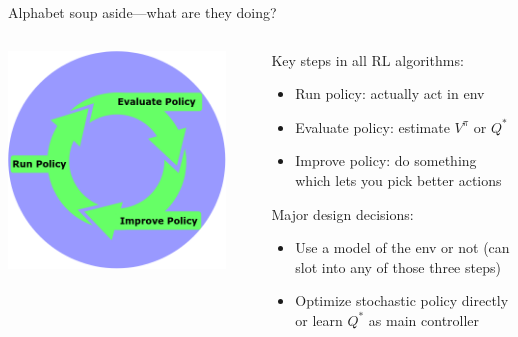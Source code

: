 \documentclass[9pt]{beamer}
\begin{document}
\begin{frame}{Alphabet soup aside---what are they doing?}


\begin{columns}
\begin{column}{0.33\textwidth}
\includegraphics[width=0.9\textwidth]{rl_loop}
\end{column}
\begin{column}{0.67\textwidth}
Key steps in all RL algorithms:
\begin{itemize}
\item Run policy: actually act in env
\item Evaluate policy: estimate $V^{\pi}$ or $Q^*$
\item Improve policy: do something which lets you pick better actions
\end{itemize}

Major design decisions:
\begin{itemize}
\item Use a model of the env or not (can slot into any of those three steps)
\item Optimize stochastic policy directly or learn $Q^*$ as main controller
\end{itemize}
\end{column}
\end{columns}

\end{frame}
\end{document}
